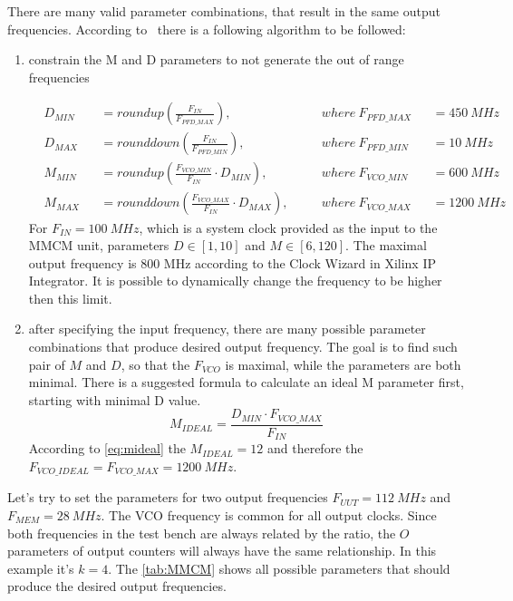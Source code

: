 There are many valid parameter combinations, that result in the same output frequencies. According to~\cite{manual:MMCM} there is a following algorithm to be followed:
\begin{enumerate}
    \item constrain the M and D parameters to not generate the out of range frequencies 

    \begin{subequations}
        \begin{alignat}{4}
            & D_{MIN} &&=roundup(\frac{F_{IN}}{F_{PFD\_MAX}}),\quad && where \ F_{PFD\_MAX} && =450 \ MHz \label{eq:dmin}\\
            & D_{MAX} &&=rounddown(\frac{F_{IN}}{F_{PFD\_MIN}}),\quad  && where \ F_{PFD\_MIN} && =10 \ MHz \label{eq:dmax}\\
            & M_{MIN} &&=roundup(\frac{F_{VCO\_MIN}}{F_{IN}} \cdot D_{MIN}),\quad && where \ F_{VCO\_MIN} && =600 \ MHz \label{eq:mmin}\\
            & M_{MAX} &&=rounddown(\frac{F_{VCO\_MAX}}{F_{IN}} \cdot D_{MAX}),\quad && where \ F_{VCO\_MAX} && =1200 \ MHz \label{eq:mmax}
        \end{alignat}
    \end{subequations}
For $F_{IN} = 100 \ MHz$, which is a system clock provided as the input to the MMCM unit, parameters $D \in [1,10]$ and $M \in [6,120]$. The maximal output frequency is 800 MHz according to the Clock Wizard in Xilinx IP Integrator. It is possible to dynamically change the frequency to be higher then this limit.
    \item after specifying the input frequency, there are many possible parameter combinations that produce desired output frequency. The goal is to find such pair of $M$ and $D$, so that the $F_{VCO}$ is maximal, while the parameters are both minimal. There is a suggested formula to calculate an ideal M parameter first, starting with minimal D value.
    \begin{equation}
         M_{IDEAL} = \frac{D_{MIN} \cdot F_{VCO\_MAX}}{F_{IN}} \label{eq:mideal}
    \end{equation}
    According to \autoref{eq:mideal} the $ M_{IDEAL} = 12$ and therefore the $F_{VCO\_IDEAL}=F_{VCO\_MAX}=1200 \ MHz$. 
\end{enumerate}
Let's try to set the parameters for two output frequencies $F_{UUT} = 112 \ MHz$ and $F_{MEM} = 28 \ MHz$. The VCO frequency is common for all output clocks. Since both frequencies in the test bench are always related by the ratio, the $O$ parameters of output counters will always have the same relationship. In this example it's $k=4$.
The \autoref{tab:MMCM} shows all possible parameters that should produce the desired output frequencies.

